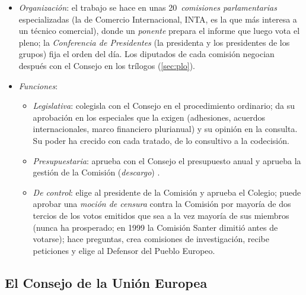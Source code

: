 \documentclass[11pt]{article}
\begin{document}
\begin{itemize}
\item \emph{Organización}: el trabajo se hace en unas 20~\emph{comisiones parlamentarias} especializadas (la de Comercio Internacional, INTA, es la que más interesa a un técnico comercial), donde un \emph{ponente} prepara el informe que luego vota el pleno; la \emph{Conferencia de Presidentes} (la presidenta y los presidentes de los grupos) fija el orden del día. Los diputados de cada comisión negocian después con el Consejo en los trílogos (\ref{sec:plo}).
\item \emph{Funciones}:
  \begin{itemize}
  \item \emph{Legislativa}: colegisla con el Consejo en el procedimiento ordinario; da su aprobación en los especiales que la exigen (adhesiones, acuerdos internacionales, marco financiero plurianual) y su opinión en la consulta. Su poder ha crecido con cada tratado, de lo consultivo a la codecisión.
  \item \emph{Presupuestaria}: aprueba con el Consejo el presupuesto anual y aprueba la gestión de la Comisión (\emph{descargo}) .
  \item \emph{De control}: elige al presidente de la Comisión y aprueba el Colegio; puede aprobar una \emph{moción de censura} contra la Comisión por mayoría de dos tercios de los votos emitidos que sea a la vez mayoría de sus miembros (nunca ha prosperado; en 1999 la Comisión Santer dimitió antes de votarse); hace preguntas, crea comisiones de investigación, recibe peticiones y elige al Defensor del Pueblo Europeo.
  \end{itemize}
\end{itemize}

\subsection{El Consejo de la Unión Europea}\label{sec:consejo}
\end{document}
